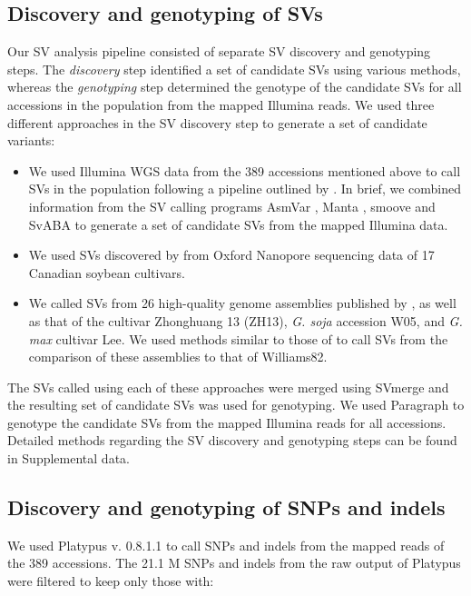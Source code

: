 \subsection*{Discovery and genotyping of SVs}
\label{sv-gwas-sv-discovery-genotyping}

Our SV analysis pipeline consisted of separate SV discovery and genotyping steps.
The \emph{discovery} step identified a set of candidate SVs using various methods,
whereas the \emph{genotyping} step determined the genotype
of the candidate SVs for all accessions in the population from the mapped Illumina reads. We used three different
approaches in the SV discovery step to generate a set of candidate variants:

\begin{itemize}
	\item We used Illumina WGS data from the 389 accessions mentioned above
		to call SVs in the population following a pipeline outlined
		by \cite{lemay2022}. In brief, we combined information from
		the SV calling programs AsmVar \citep{liu2015}, Manta \citep{chen2016},
		smoove \citep{pedersen2019} and SvABA \citep{wala2018} to generate
		a set of candidate SVs from the mapped Illumina data.
	\item We used SVs discovered by \cite{lemay2022} from Oxford Nanopore
		sequencing data of 17 Canadian soybean cultivars.
	\item We called SVs from 26 high-quality genome assemblies published by
		\cite{liu2020-pangenome}, as well as that of the cultivar Zhonghuang 13 (ZH13),
		\textit{G. soja} accession W05, and \textit{G. max} cultivar Lee.
		We used methods similar to those of \cite{liu2020-pangenome} to call
		SVs from the comparison of these assemblies to that of Williams82.
\end{itemize}

The SVs called using each of these approaches were merged using SVmerge
\citep{wong2010} and the resulting set of candidate SVs was used for
genotyping. We used Paragraph \citep{chen2019} to genotype the candidate SVs
from the mapped Illumina reads for all accessions. Detailed methods regarding
the SV discovery and genotyping steps can be found in Supplemental data.

\subsection*{Discovery and genotyping of SNPs and indels}
\label{sv-gwas-snp-discovery}

We used Platypus v. 0.8.1.1 \citep{rimmer2014} to call SNPs and indels from the
mapped reads of the 389 accessions. The 21.1 M SNPs and
indels from the raw output of Platypus were filtered to keep only those with:

